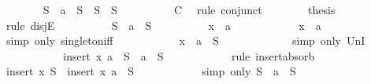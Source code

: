 \begin{isabellebody}
\ \ \ \ \ \ \isamarkupfalse%
\ {\isachardoublequoteopen}S\ {\isacharequal}\ {\isacharbraceleft}a{\isacharbraceright}\ {\isasymunion}\ S{\isacharprime}\ {\isasymor}\ S\ {\isacharequal}\ S{\isacharprime}{\isachardoublequoteclose}\isanewline
\ \ \ \ \ \ \ \ \isamarkupfalse%
\ C{}\ \isamarkupfalse%
\ {\isacharparenleft}rule\ conjunct{}{\isacharparenright}\isanewline
\ \ \ \ \ \ \isamarkupfalse%
\ {\isacharquery}thesis\isanewline
\ \ \ \ \ \ \isamarkupfalse%
\ {\isacharparenleft}rule\ disjE{\isacharparenright}\isanewline
\ \ \ \ \ \ \ \ \isamarkupfalse%
\ {\isachardoublequoteopen}S\ {\isacharequal}\ {\isacharbraceleft}a{\isacharbraceright}\ {\isasymunion}\ S{\isacharprime}{\isachardoublequoteclose}\isanewline
\ \ \ \ \ \ \ \ \isamarkupfalse%
\ {\isachardoublequoteopen}x\ {\isasymin}\ {\isacharbraceleft}a{\isacharbraceright}{\isachardoublequoteclose}\isanewline
\ \ \ \ \ \ \ \ \ \ \isamarkupfalse%
\ {\isacartoucheopen}x\ {\isacharequal}\ a{\isacartoucheclose}\ \isamarkupfalse%
\ {\isacharparenleft}simp\ only{\isacharcolon}\ singleton{\isacharunderscore}iff{\isacharparenright}\isanewline
\ \ \ \ \ \ \ \ \isamarkupfalse%
\ \isamarkupfalse%
\ {\isachardoublequoteopen}x\ {\isasymin}\ {\isacharbraceleft}a{\isacharbraceright}\ {\isasymunion}\ S{\isacharprime}{\isachardoublequoteclose}\ \isanewline
\ \ \ \ \ \ \ \ \ \ \isamarkupfalse%
\ {\isacharparenleft}simp\ only{\isacharcolon}\ UnI{}{\isacharparenright}\isanewline
\ \ \ \ \ \ \ \ \isamarkupfalse%
\ \isamarkupfalse%
\ {\isachardoublequoteopen}insert\ x\ {\isacharparenleft}{\isacharbraceleft}a{\isacharbraceright}\ {\isasymunion}\ S{\isacharprime}{\isacharparenright}\ {\isacharequal}\ {\isacharbraceleft}a{\isacharbraceright}\ {\isasymunion}\ S{\isacharprime}{\isachardoublequoteclose}\isanewline
\ \ \ \ \ \ \ \ \ \ \isamarkupfalse%
\ {\isacharparenleft}rule\ insert{\isacharunderscore}absorb{\isacharparenright}\isanewline
\ \ \ \ \ \ \ \ \isamarkupfalse%
\ {\isachardoublequoteopen}insert\ x\ S\ {\isacharequal}\ insert\ x\ {\isacharparenleft}{\isacharbraceleft}a{\isacharbraceright}\ {\isasymunion}\ S{\isacharprime}{\isacharparenright}{\isachardoublequoteclose}\isanewline
\ \ \ \ \ \ \ \ \ \ \isamarkupfalse%
\ {\isacharparenleft}simp\ only{\isacharcolon}\ {\isacartoucheopen}S\ {\isacharequal}\ {\isacharbraceleft}a{\isacharbraceright}\ {\isasymunion}\ S{\isacharprime}{\isacartoucheclose}{\isacharparenright}\isanewline

\end{isabellebody}
